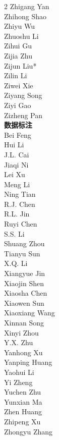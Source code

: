 \documentclass[11pt, a4paper, logo, copyright, nonumbering]{deepseek}
\begin{document}
\begin{multicols}{2}
\color{damaiblue} Zhigang Yan \\
\color{damaiblue} Zhihong Shao \\
\color{damaiblue} Zhiyu Wu \\
\color{damaiblue} Zhuoshu Li \\
\color{damaiblue} Zihui Gu \\
\color{damaiblue} Zijia Zhu \\
\color{damaiblue} Zijun Liu* \\
\color{damaiblue} Zilin Li \\
\color{damaiblue} Ziwei Xie \\
\color{damaiblue} Ziyang Song \\
\color{damaiblue} Ziyi Gao \\
\color{damaiblue} Zizheng Pan \\

\noindent
\textbf{\color{damaigreen} 数据标注} \\
\color{damaigreen} Bei Feng \\
\color{damaigreen} Hui Li \\
\color{damaigreen} J.L. Cai \\
\color{damaigreen} Jiaqi Ni \\
\color{damaigreen} Lei Xu \\
\color{damaigreen} Meng Li \\
\color{damaigreen} Ning Tian \\
\color{damaigreen} R.J. Chen \\
\color{damaigreen} R.L. Jin \\
\color{damaigreen} Ruyi Chen \\
\color{damaigreen} S.S. Li \\
\color{damaigreen} Shuang Zhou \\
\color{damaigreen} Tianyu Sun \\
\color{damaigreen} X.Q. Li \\
\color{damaigreen} Xiangyue Jin \\
\color{damaigreen} Xiaojin Shen \\
\color{damaigreen} Xiaosha Chen \\
\color{damaigreen} Xiaowen Sun \\
\color{damaigreen} Xiaoxiang Wang \\
\color{damaigreen} Xinnan Song \\
\color{damaigreen} Xinyi Zhou \\
\color{damaigreen} Y.X. Zhu \\
\color{damaigreen} Yanhong Xu \\
\color{damaigreen} Yanping Huang \\
\color{damaigreen} Yaohui Li \\
\color{damaigreen} Yi Zheng \\
\color{damaigreen} Yuchen Zhu \\
\color{damaigreen} Yunxian Ma \\
\color{damaigreen} Zhen Huang \\
\color{damaigreen} Zhipeng Xu \\
\color{damaigreen} Zhongyu Zhang \\


\end{multicols}
\end{document}
